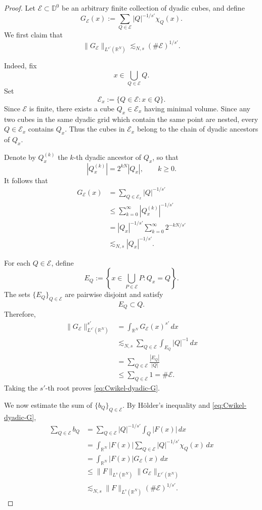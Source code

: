 \documentclass[12pt]{amsart}
\begin{document}
\begin{proof}
Let $\mathcal E\subset\mathbb D^0$ be an arbitrary finite collection
of dyadic cubes, and define
\[
G_{\mathcal E}(x)
:=
\sum_{Q\in\mathcal E}
|Q|^{-1/s'}\chi_Q(x).
\]
We first claim that
\begin{equation}\label{eq:Cwikel-dyadic-G}
\|G_{\mathcal E}\|_{L^{s'}(\mathbb R^N)}
\lesssim_{N,s}
(\#\mathcal E)^{1/s'}.
\end{equation}

Indeed, fix
\[
x\in\bigcup_{Q\in\mathcal E}Q.
\]
Set
\[
\mathcal E_x
:=
\{Q\in\mathcal E:x\in Q\}.
\]
Since $\mathcal E$ is finite, there exists a cube
$Q_x\in\mathcal E_x$ having minimal volume. Since any two cubes in
the same dyadic grid which contain the same point are nested, every
$Q\in\mathcal E_x$ contains $Q_x$. Thus the cubes in
$\mathcal E_x$ belong to the chain of dyadic ancestors of $Q_x$.

Denote by $Q_x^{(k)}$ the $k$-th dyadic ancestor of $Q_x$, so that
\[
|Q_x^{(k)}|
=
2^{kN}|Q_x|,
\qquad k\geq0.
\]
It follows that
\begin{align*}
G_{\mathcal E}(x)
&=
\sum_{Q\in\mathcal E_x}|Q|^{-1/s'}
\\
&\leq
\sum_{k=0}^{\infty}
|Q_x^{(k)}|^{-1/s'}
\\
&=
|Q_x|^{-1/s'}
\sum_{k=0}^{\infty}
2^{-kN/s'}
\\
&\lesssim_{N,s}
|Q_x|^{-1/s'}.
\end{align*}

For each $Q\in\mathcal E$, define
\[
E_Q
:=
\left\{
x\in\bigcup_{P\in\mathcal E}P:
Q_x=Q
\right\}.
\]
The sets $\{E_Q\}_{Q\in\mathcal E}$ are pairwise disjoint and
satisfy
\[
E_Q\subset Q.
\]
Therefore,
\begin{align*}
\|G_{\mathcal E}\|_{L^{s'}(\mathbb R^N)}^{s'}
&=
\int_{\mathbb R^N}
G_{\mathcal E}(x)^{s'}\,dx
\\
&\lesssim_{N,s}
\sum_{Q\in\mathcal E}
\int_{E_Q}|Q|^{-1}\,dx
\\
&=
\sum_{Q\in\mathcal E}
\frac{|E_Q|}{|Q|}
\\
&\leq
\sum_{Q\in\mathcal E}1
=
\#\mathcal E.
\end{align*}
Taking the $s'$-th root proves
\eqref{eq:Cwikel-dyadic-G}.

We now estimate the sum of $\{b_Q\}_{Q\in\mathcal E}$. By
H\"older's inequality and \eqref{eq:Cwikel-dyadic-G},
\begin{align*}
\sum_{Q\in\mathcal E}b_Q
&=
\sum_{Q\in\mathcal E}
|Q|^{-1/s'}
\int_Q|F(x)|\,dx
\\
&=
\int_{\mathbb R^N}
|F(x)|
\sum_{Q\in\mathcal E}
|Q|^{-1/s'}\chi_Q(x)\,dx
\\
&=
\int_{\mathbb R^N}
|F(x)|G_{\mathcal E}(x)\,dx
\\
&\leq
\|F\|_{L^s(\mathbb R^N)}
\|G_{\mathcal E}\|_{L^{s'}(\mathbb R^N)}
\\
&\lesssim_{N,s}
\|F\|_{L^s(\mathbb R^N)}
(\#\mathcal E)^{1/s'}.
\end{align*}


\end{proof}
\end{document}
